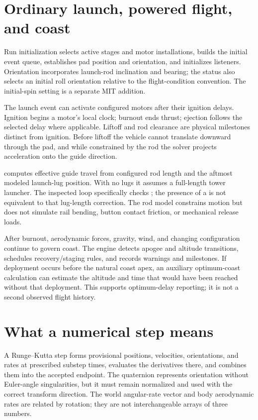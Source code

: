 \section{Ordinary launch, powered flight, and coast}
Run initialization selects active stages and motor installations, builds the initial event queue, establishes pad position and orientation, and initializes listeners. Orientation incorporates launch-rod inclination and bearing; the status also selects an initial roll orientation relative to the flight-condition convention. The initial-spin setting is a separate MIT addition.

The launch event can activate configured motors after their ignition delays. Ignition begins a motor's local clock; burnout ends thrust; ejection follows the selected delay where applicable. Liftoff and rod clearance are physical milestones distinct from ignition. Before liftoff the vehicle cannot translate downward through the pad, and while constrained by the rod the solver projects acceleration onto the guide direction.

 computes effective guide travel from configured rod length and the aftmost modeled launch-lug position. With no lugs it assumes a full-length tower launcher. The inspected loop specifically checks ; the presence of a  is not equivalent to that lug-length correction. The rod model constrains motion but does not simulate rail bending, button contact friction, or mechanical release loads.

After burnout, aerodynamic forces, gravity, wind, and changing configuration continue to govern coast. The engine detects apogee and altitude transitions, schedules recovery/staging rules, and records warnings and milestones. If deployment occurs before the natural coast apex, an auxiliary optimum-coast calculation can estimate the altitude and time that would have been reached without that deployment. This supports optimum-delay reporting; it is not a second observed flight history.

\section{What a numerical step means}
A Runge--Kutta step forms provisional positions, velocities, orientations, and rates at prescribed substep times, evaluates the derivatives there, and combines them into the accepted endpoint. The quaternion represents orientation without Euler-angle singularities, but it must remain normalized and used with the correct transform direction. The world angular-rate vector and body aerodynamic rates are related by rotation; they are not interchangeable arrays of three numbers.

